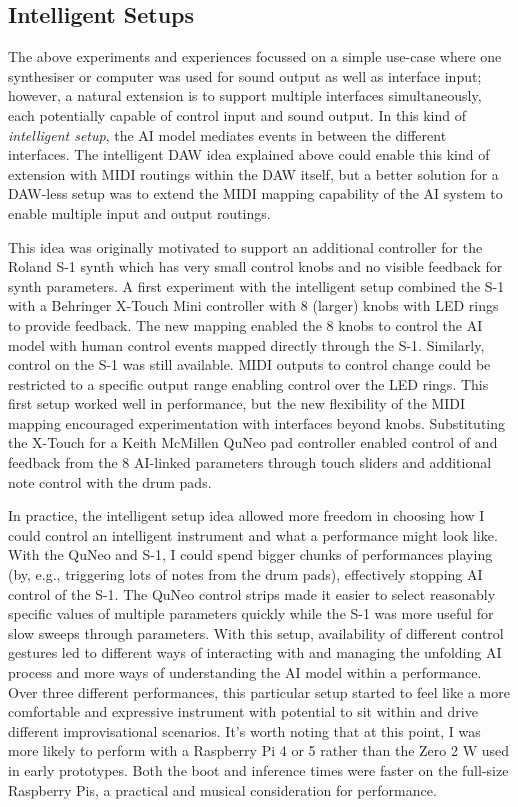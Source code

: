 \documentclass[sigconf]{nimeart}
\begin{document}
\subsection{Intelligent Setups}

The above experiments and experiences focussed on a simple use-case where one synthesiser or computer was used for sound output as well as interface input; however, a natural extension is to support multiple interfaces simultaneously, each potentially capable of control input and sound output. 
In this kind of \emph{intelligent setup}, the AI model mediates events in between the different interfaces. 
The intelligent DAW idea explained above could enable this kind of extension with MIDI routings within the DAW itself, but a better solution for a DAW-less setup was to extend the MIDI mapping capability of the AI system to enable multiple input and output routings.

This idea was originally motivated to support an additional controller for the Roland S-1 synth which has very small control knobs and no visible feedback for synth parameters. 
A first experiment with the intelligent setup combined the S-1 with a Behringer X-Touch Mini controller with 8 (larger) knobs with LED rings to provide feedback.
The new mapping enabled the 8 knobs to control the AI model with human control events mapped directly through the S-1. 
Similarly, control on the S-1 was still available. 
MIDI outputs to control change could be restricted to a specific output range enabling control over the LED rings.
This first setup worked well in performance, but the new flexibility of the MIDI mapping encouraged experimentation with interfaces beyond knobs. 
Substituting the X-Touch for a Keith McMillen QuNeo pad controller enabled control of and feedback from the 8 AI-linked parameters through touch sliders and additional note control with the drum pads.

In practice, the intelligent setup idea allowed more freedom in choosing how I could control an intelligent instrument and what a performance might look like. 
With the QuNeo and S-1, I could spend bigger chunks of performances playing (by, e.g., triggering lots of notes from the drum pads), effectively stopping AI control of the S-1.
The QuNeo control strips made it easier to select reasonably specific values of multiple parameters quickly while the S-1 was more useful for slow sweeps through parameters.
With this setup, availability of different control gestures led to different ways of interacting with and managing the unfolding AI process and more ways of understanding the AI model within a performance.
Over three different performances, this particular setup started to feel like a more comfortable and expressive instrument with potential to sit within and drive different improvisational scenarios.
It's worth noting that at this point, I was more likely to perform with a Raspberry Pi 4 or 5 rather than the Zero 2 W used in early prototypes. 
Both the boot and inference times were faster on the full-size Raspberry Pis, a practical and musical consideration for performance.
\end{document}
